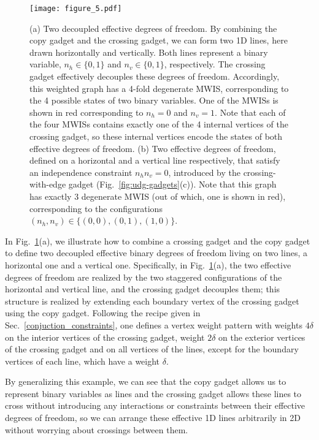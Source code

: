 \begin{figure}
    \texttt{[image: figure\_5.pdf]}
  \caption{(a) Two decoupled effective degrees of freedom. By combining the copy gadget and the crossing gadget, we can form two 1D lines, here drawn horizontally and vertically. Both lines represent a binary variable, $n_h\in\{0,1\}$ and $n_v\in\{0,1\}$, respectively. The crossing gadget effectively decouples these degrees of freedom. Accordingly, this weighted graph has a 4-fold degenerate MWIS, corresponding to the 4 possible states of two binary variables. One of the MWISs is shown in red corresponding to $n_h=0$ and $n_v=1$. Note that each of the four MWISs contains exactly one of the 4 internal vertices of the crossing gadget, so these internal vertices encode the states of both effective degrees of freedom. (b) Two effective degrees of freedom, defined on a horizontal and a vertical line respectively, that satisfy an independence constraint $n_hn_v=0$, introduced by the crossing-with-edge gadget (Fig.~\ref{fig:udg-gadgets}(c)). Note that this graph has exactly 3 degenerate MWIS (out of which, one is shown in red), corresponding to the configurations $(n_h,n_v)\in\{(0,0),(0,1),(1,0)\}$.   }
    \label{fig:crossing_effective}
\end{figure}

In Fig.~\ref{fig:crossing_effective}(a), we illustrate how to combine a crossing gadget and the copy gadget to define two decoupled effective binary degrees of freedom living on two lines, a horizontal one and a vertical one. Specifically, in Fig.~\ref{fig:crossing_effective}(a), the two effective degrees of freedom are realized by the two staggered configurations of the horizontal and vertical line, and the crossing gadget decouples them; this structure is realized by extending each boundary vertex of the crossing gadget using the copy gadget. Following the recipe given in Sec.~\ref{conjuction_constraints}, one defines a vertex weight pattern with weights $4\delta$ on the interior vertices of the crossing gadget, weight  $2\delta$ on the exterior vertices of the crossing gadget and on all vertices of the lines, except for the boundary vertices of each line, which have a weight $\delta$.

By generalizing this example, we can see that the copy gadget allows us to represent binary variables as lines and the crossing gadget allows these lines to cross without introducing any interactions or constraints between their effective degrees of freedom, so we can arrange these effective 1D lines arbitrarily in 2D without worrying about crossings between them.


